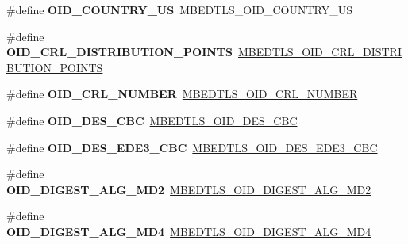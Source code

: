 \begin{DoxyCompactItemize}
\item 
\mbox{\label{compat-1_83_8h_af1cac94c1d85ce021e8f6b9c7643defb}} 
\#define {\bfseries O\+I\+D\+\_\+\+C\+O\+U\+N\+T\+R\+Y\+\_\+\+US}~M\+B\+E\+D\+T\+L\+S\+\_\+\+O\+I\+D\+\_\+\+C\+O\+U\+N\+T\+R\+Y\+\_\+\+US
\item 
\mbox{\label{compat-1_83_8h_a537e5d1b64118f338d38e40d9e6ffece}} 
\#define {\bfseries O\+I\+D\+\_\+\+C\+R\+L\+\_\+\+D\+I\+S\+T\+R\+I\+B\+U\+T\+I\+O\+N\+\_\+\+P\+O\+I\+N\+TS}~\mbox{\hyperlink{oid_8h_a8184fdce4edfcc2cccc03eedc5a195c8}{M\+B\+E\+D\+T\+L\+S\+\_\+\+O\+I\+D\+\_\+\+C\+R\+L\+\_\+\+D\+I\+S\+T\+R\+I\+B\+U\+T\+I\+O\+N\+\_\+\+P\+O\+I\+N\+TS}}
\item 
\mbox{\label{compat-1_83_8h_a7861cf0cb3c6db1d16f0cc84b353846c}} 
\#define {\bfseries O\+I\+D\+\_\+\+C\+R\+L\+\_\+\+N\+U\+M\+B\+ER}~\mbox{\hyperlink{oid_8h_a1c760658437633541572c413a2856ac4}{M\+B\+E\+D\+T\+L\+S\+\_\+\+O\+I\+D\+\_\+\+C\+R\+L\+\_\+\+N\+U\+M\+B\+ER}}
\item 
\mbox{\label{compat-1_83_8h_a3820cfd911996e1b585c81130dffef7f}} 
\#define {\bfseries O\+I\+D\+\_\+\+D\+E\+S\+\_\+\+C\+BC}~\mbox{\hyperlink{oid_8h_ab9e4760b2ab848c9b6096d2068c194e6}{M\+B\+E\+D\+T\+L\+S\+\_\+\+O\+I\+D\+\_\+\+D\+E\+S\+\_\+\+C\+BC}}
\item 
\mbox{\label{compat-1_83_8h_a16ffb3be871a2c85bd68452dc69bf554}} 
\#define {\bfseries O\+I\+D\+\_\+\+D\+E\+S\+\_\+\+E\+D\+E3\+\_\+\+C\+BC}~\mbox{\hyperlink{oid_8h_a87a6b55d263cb7c94f7d96acc90af328}{M\+B\+E\+D\+T\+L\+S\+\_\+\+O\+I\+D\+\_\+\+D\+E\+S\+\_\+\+E\+D\+E3\+\_\+\+C\+BC}}
\item 
\mbox{\label{compat-1_83_8h_a04aa6fd4e47d25ddfb9961fba1e551a3}} 
\#define {\bfseries O\+I\+D\+\_\+\+D\+I\+G\+E\+S\+T\+\_\+\+A\+L\+G\+\_\+\+M\+D2}~\mbox{\hyperlink{oid_8h_a5683b895dfdb0efd8ed461837e8da7a1}{M\+B\+E\+D\+T\+L\+S\+\_\+\+O\+I\+D\+\_\+\+D\+I\+G\+E\+S\+T\+\_\+\+A\+L\+G\+\_\+\+M\+D2}}
\item 
\mbox{\label{compat-1_83_8h_a653b661a06467aff6d711c0b388f197d}} 
\#define {\bfseries O\+I\+D\+\_\+\+D\+I\+G\+E\+S\+T\+\_\+\+A\+L\+G\+\_\+\+M\+D4}~\mbox{\hyperlink{oid_8h_a99fd3f40fd5ab8242eae58f46ecc3778}{M\+B\+E\+D\+T\+L\+S\+\_\+\+O\+I\+D\+\_\+\+D\+I\+G\+E\+S\+T\+\_\+\+A\+L\+G\+\_\+\+M\+D4}}

\end{DoxyCompactItemize}
